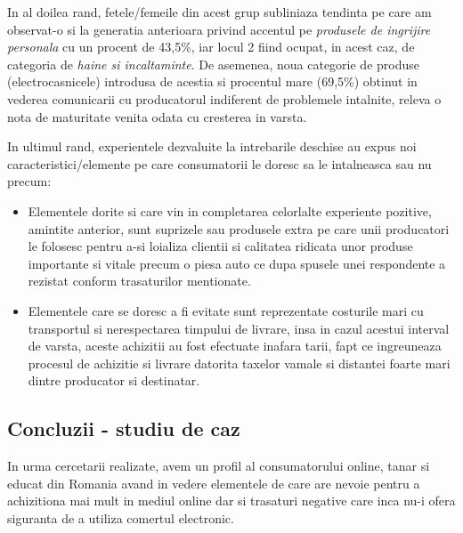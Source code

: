 \documentclass[a4paper, 12pt]{article}
\begin{document}
\begin{itemize}
		\quad In al doilea rand, fetele/femeile din acest grup subliniaza tendinta pe care am observat-o si la generatia anterioara privind accentul pe \textit{produsele de ingrijire personala} cu un procent de 43,5\%, iar locul 2 fiind ocupat, in acest caz, de categoria de \textit{haine si incaltaminte}. De asemenea, noua categorie de produse (electrocasnicele)  introdusa de acestia si procentul mare (69,5\%) obtinut in vederea comunicarii cu producatorul indiferent de problemele intalnite, releva o nota de maturitate venita odata cu cresterea in varsta.
		
		\quad In ultimul rand, experientele dezvaluite la intrebarile deschise au expus noi caracteristici/elemente pe care consumatorii le doresc sa le intalneasca sau nu precum:
		\begin{itemize}
			\item Elementele dorite si care vin in completarea celorlalte experiente pozitive, amintite anterior, sunt suprizele sau produsele extra pe care unii producatori le folosesc pentru a-si loializa clientii si  calitatea ridicata unor produse importante si vitale precum o piesa auto ce dupa spusele unei respondente a rezistat conform trasaturilor mentionate.
			\item Elementele care se doresc a fi evitate sunt reprezentate costurile mari cu transportul si nerespectarea timpului de livrare, insa in cazul acestui interval de varsta, aceste achizitii au fost efectuate inafara tarii, fapt ce ingreuneaza procesul de achizitie si livrare datorita taxelor vamale si distantei foarte mari dintre producator si destinatar.
		\end{itemize}
	\end{itemize}
	
	\subsection{Concluzii - studiu de caz}
	\qquad In urma cercetarii realizate, avem un profil al consumatorului online, tanar si educat din Romania avand in vedere elementele de care are nevoie pentru a achizitiona mai mult in mediul online dar si trasaturi negative care inca nu-i ofera siguranta de a utiliza comertul electronic.
	
\end{document}
